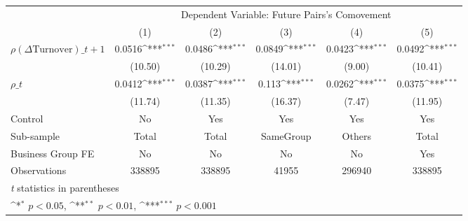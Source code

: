 {
\def\sym#1{\ifmmode^{#1}\else\(^{#1}\)\fi}
\begin{tabular}{l*{5}{c}}
\hline\hline
                    &\multicolumn{5}{c}{Dependent Variable:  Future Pairs's Comovement}                                           \\\cmidrule(lr){2-6}
                    &\multicolumn{1}{c}{(1)}         &\multicolumn{1}{c}{(2)}         &\multicolumn{1}{c}{(3)}         &\multicolumn{1}{c}{(4)}         &\multicolumn{1}{c}{(5)}         \\
\hline
 $ {\rho(\Delta \text{Turnover})\_{t+1}} $ &      0.0516\sym{***}&      0.0486\sym{***}&      0.0849\sym{***}&      0.0423\sym{***}&      0.0492\sym{***}\\
                    &     (10.50)         &     (10.29)         &     (14.01)         &      (9.00)         &     (10.41)         \\
[1em]
 $ {\rho\_t} $       &      0.0412\sym{***}&      0.0387\sym{***}&       0.113\sym{***}&      0.0262\sym{***}&      0.0375\sym{***}\\
                    &     (11.74)         &     (11.35)         &     (16.37)         &      (7.47)         &     (11.95)         \\
\hline
Control             &          No         &         Yes         &         Yes         &         Yes         &         Yes         \\
Sub-sample          &       Total         &       Total         &   SameGroup         &      Others         &       Total         \\
Business Group FE   &          No         &          No         &          No         &          No         &         Yes         \\
Observations        &      338895         &      338895         &       41955         &      296940         &      338895         \\
\hline\hline
\multicolumn{6}{l}{\footnotesize \textit{t} statistics in parentheses}\\
\multicolumn{6}{l}{\footnotesize \sym{*} \(p<0.05\), \sym{**} \(p<0.01\), \sym{***} \(p<0.001\)}\\
\end{tabular}
}

